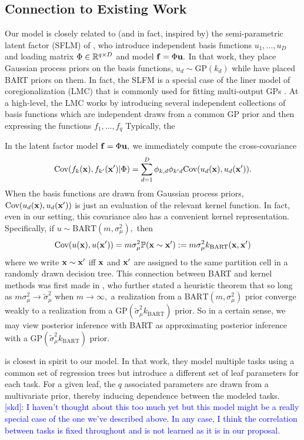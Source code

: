 \documentclass[12pt]{article}
\begin{document}
\subsection{Connection to Existing Work}
\label{sec:related_work}

Our model is closely related to (and in fact, inspired by) the semi-parametric latent factor (SFLM) of \citet{Teh2005}, who introduce independent basis functions $u_{1}, \ldots, u_{D}$ and loading matrix $\Phi \in \mathbb{R}^{q \times D}$ and model $\mathbf{f} = \Phi \mathbf{u}.$
In that work, they place Gaussian process priors on the basis functions, $u_{d} \sim \text{GP}(k_{d})$ while have placed BART priors on them. 
In fact, the SLFM is a special case of the liner model of coregionalization (LMC) that is commonly used for fitting multi-output GPs \citep[see, e.g.][]{Alvarez2012}.
At a high-level, the LMC works by introducing several independent collections of basis functions which are independent draws from a common GP prior and then expressing the functions $f_{1}, \ldots, f_{q}$ 
Typically, the 

In the latent factor model $\mathbf{f} = \Phi \mathbf{u},$ we immediately compute the cross-covariance
$$
\text{Cov}(f_{k}(\mathbf{x}), f_{k'}(\mathbf{x}') | \Phi) = \sum_{d = 1}^{D}{\phi_{k,d}\phi_{k'd}\text{Cov}(u_{d}(\mathbf{x}), u_{d}(\mathbf{x}'))}.
$$
When the basis functions are drawn from Gaussian process priors, $\text{Cov}(u_{d}(\mathbf{x}), u_{d}(\mathbf{x}'))$ is just an evaluation of the relevant kernel function.
In fact, even in our setting, this covariance also has a convenient kernel representation.
Specifically, if $u \sim \text{BART}(m, \sigma^{2}_{\mu}),$ then 
$$
\text{Cov}(u(\mathbf{x}), u(\mathbf{x}')) = m\sigma^{2}_{\mu}\mathbb{P}(\mathbf{x} \sim \mathbf{x}') := m\sigma^{2}_{\mu}k_{\text{BART}}(\mathbf{x}, \mathbf{x}')
$$
where we write $\mathbf{x} \sim \mathbf{x}'$ iff $\mathbf{x}$ and $\mathbf{x}'$ are assigned to the same partition cell in a randomly drawn decision tree. 
This connection between BART and kernel methods was first made in \citet{Linero2017}, who further stated a heuristic theorem that so long as $m\sigma^{2}_{\mu} \rightarrow \tilde{\sigma}^{2}_{\mu}$ when $m \rightarrow \infty,$ a realization from a $\text{BART}(m,\sigma^{2}_{\mu})$ prior converge weakly to a realization from a $\text{GP}(\tilde{\sigma}^{2}_{\mu}k_{\text{BART}})$ prior.
So in a certain sense, we may view posterior inference with BART as approximating posterior inference with a $\text{GP}(\tilde{\sigma}^{2}_{\mu}k_{\text{BART}})$ prior.



\citet{Linero2018} is closest in spirit to our model.
In that work, they model multiple tasks using a common set of regression trees but introduce a different set of leaf parameters for each task.
For a given leaf, the $q$ associated parameters are drawn from a multivariate prior, thereby inducing dependence between the modeled tasks.
\textcolor{blue}{[skd]: I haven't thought about this too much yet but this model might be a really special case of the one we've described above. In any case, I think the correlation between tasks is fixed throughout and is not learned as it is in our proposal.}
\end{document}
